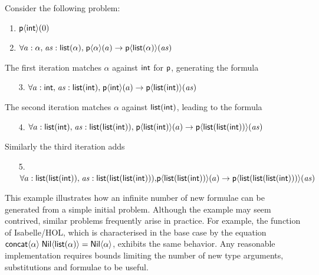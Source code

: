 \documentclass[runningheads]{llncs}
\begin{document}
\begin{example}Consider the following problem:
\begin{enumerate}
   \item \(\textsf{p}\langle \textsf{int}\rangle(0)\)
   \item \(\forall a: \alpha{,}\; \mathit{as}:\textsf{list}(\alpha){,}\; \textsf{p}\langle\alpha\rangle(a) \rightarrow \textsf{p}\langle \textsf{list}(\alpha)\rangle(\mathit{as})\)
\end{enumerate}
%
The first iteration matches \(\alpha\) against \(\textsf{int}\) for $\textsf{p}$, generating the formula
%
\begin{enumerate}
   \item[3.] \(\forall a: \textsf{int}{,}\; \mathit{as}:\textsf{list}(\textsf{int}){,}\; \textsf{p}\langle\textsf{int}\rangle(a) \rightarrow \textsf{p}\langle \textsf{list}(\textsf{int})\rangle(\mathit{as})\)
\end{enumerate}
%
The second iteration matches \(\alpha\) against \(\textsf{list}(\textsf{int})\), leading to the formula
%
\begin{enumerate}
   \item[4.] \(\forall a: \textsf{list}(\textsf{int}){,}\; \mathit{as}:\textsf{list}(\textsf{list}(\textsf{int})){,}\; \textsf{p}\langle\textsf{list}(\textsf{int})\rangle(a) \rightarrow \textsf{p}\langle \textsf{list}(\textsf{list}(\textsf{int}))\rangle(\mathit{as})\)
\end{enumerate}
%
Similarly the third iteration adds
%
\begin{enumerate}
   \item[5.] 
         \( \forall a: \textsf{list}(\textsf{list}(\textsf{int})){,}\; \mathit{as}:\textsf{list}(\textsf{list}(\textsf{list}(\textsf{int}))){,} \\ \textsf{p}\langle\textsf{list}(\textsf{list}(\textsf{int}))\rangle(a) \rightarrow \textsf{p}\langle \textsf{list}(\textsf{list}(\textsf{list}(\textsf{int})))\rangle(\mathit{as})\)
\end{enumerate}

\end{example}

This example illustrates how an infinite number of new formulae can be generated from a simple initial problem. Although the example may seem contrived, similar problems frequently arise in practice. For example, the  function of Isabelle/HOL, which is characterised in the base case by the equation \(\textsf{concat}\langle\alpha\rangle\; \textsf{Nil}\langle\textsf{list}(\alpha)\rangle = \textsf{Nil}\langle\alpha\rangle\), exhibits the same behavior. Any reasonable implementation requires bounds limiting the number of new type arguments, substitutions and formulae to be useful.
\end{document}
